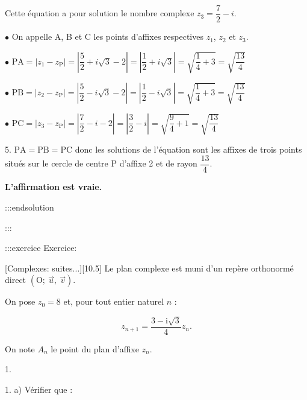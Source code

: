 \documentclass{cornouaille}
\begin{document}
Cette équation a pour solution le nombre complexe $z_3=\dfrac{7}{2}- i$.



$\bullet$  On appelle  A, B et C les points d'affixes respectives $z_1$, $z_2$ et $z_3$.







$\bullet$  $\mathrm{PA} = \left |  z_1 - z_{\mathrm{P}} \right | = \left | \dfrac{5}{2} + i\sqrt{3} -2 \right | = \left |  \dfrac{1}{2} +i\sqrt{3} \right | = \displaystyle\sqrt{\dfrac{1}{4} + 3} = \sqrt{\dfrac{13}{4}}$


$\bullet$  $\mathrm{PB} = \left |z_2 - z_{\mathrm{P}} \right | = \left |\dfrac{5}{2} - i\sqrt{3}-2 \right | = \left |  \dfrac{1}{2} - i\sqrt{3} \right | = \sqrt{\dfrac{1}{4} + 3} = \sqrt{\dfrac{13}{4}}$


$\bullet$  $\mathrm{PC} = \left | z_3 - z_{\mathrm{P}} \right | = \left |\dfrac{7}{2} - i -2 \right | = \left | \dfrac{3}{2} - i \right | = \sqrt{\dfrac{9}{4} + 1} = \sqrt{\dfrac{13}{4}}$







5.  $\mathrm{PA} = \mathrm{PB} = \mathrm{PC}$ donc les solutions de l'équation sont les affixes de trois points situés sur le cercle de centre P d'affixe 2 et de rayon $\dfrac{13}{4}$.





\textbf{L'affirmation est vraie.}


:::endsolution


:::



:::exercice Exercice:

[Complexes: suites...][10.5]
Le plan complexe est muni d'un repère orthonormé direct $\left(\text{O};~\overrightarrow{u},~\overrightarrow{v}\right)$.

On pose $z_0 = 8$ et, pour tout entier naturel $n$ :


$$
z_{n+1} = \dfrac{3 - \text{i}\sqrt{3}}{4}z_n.
$$


On note $A_n$ le point du plan d'affixe $z_n$.

\medskip





1. 




1. a)  Vérifier que :
\end{document}
